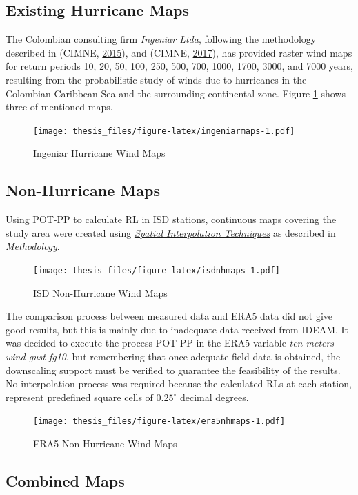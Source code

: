 \documentclass[12pt,twoside]{reedthesis}
\begin{document}
\hypertarget{existing-hurricane-maps}{%
\subsection{Existing Hurricane Maps}\label{existing-hurricane-maps}}

The Colombian consulting firm \emph{Ingeniar Ltda}, following the methodology described in (CIMNE, \protect\hyperlink{ref-hurricanemaps}{2015}), and (CIMNE, \protect\hyperlink{ref-hurricanemaps2}{2017}), has provided raster wind maps for return periods 10, 20, 50, 100, 250, 500, 700, 1000, 1700, 3000, and 7000 years, resulting from the probabilistic study of winds due to hurricanes in the Colombian Caribbean Sea and the surrounding continental zone. Figure \ref{fig:ingeniarmaps} shows three of mentioned maps.
\begin{figure}
\centering
\texttt{[image: thesis\_files/figure-latex/ingeniarmaps-1.pdf]}
\caption{\label{fig:ingeniarmaps}Ingeniar Hurricane Wind Maps}
\end{figure}
\hypertarget{non-hurricane-maps}{%
\subsection{Non-Hurricane Maps}\label{non-hurricane-maps}}

Using POT-PP to calculate RL in ISD stations, continuous maps covering the study area were created using \emph{\protect\hyperlink{si}{Spatial Interpolation Techniques}} as described in \emph{\protect\hyperlink{rmd-method}{Methodology}}.
\begin{figure}
\centering
\texttt{[image: thesis\_files/figure-latex/isdnhmaps-1.pdf]}
\caption{\label{fig:isdnhmaps}ISD Non-Hurricane Wind Maps}
\end{figure}
The comparison process between measured data and ERA5 data did not give good results, but this is mainly due to inadequate data received from IDEAM. It was decided to execute the process POT-PP in the ERA5 variable \emph{ten meters wind gust fg10}, but remembering that once adequate field data is obtained, the downscaling support must be verified to guarantee the feasibility of the results. No interpolation process was required because the calculated RLs at each station, represent predefined square cells of \(0.25^\circ\) decimal degrees.
\begin{figure}
\centering
\texttt{[image: thesis\_files/figure-latex/era5nhmaps-1.pdf]}
\caption{\label{fig:era5nhmaps}ERA5 Non-Hurricane Wind Maps}
\end{figure}
\hypertarget{cm}{%
\subsection{Combined Maps}\label{cm}}
\end{document}
